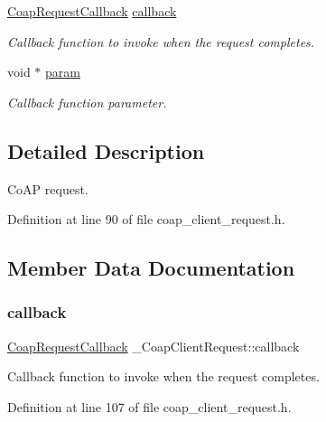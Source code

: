 \begin{DoxyCompactItemize}
\hyperlink{coap__client__request_8h_ad85f4aee9cd7facc11c34385eda31f84}{Coap\+Request\+Callback} \hyperlink{struct__CoapClientRequest_ae458e60539a2180065c26d7e624d6932}{callback}
\begin{DoxyCompactList}\small\item\em Callback function to invoke when the request completes. \end{DoxyCompactList}\item 
void $\ast$ \hyperlink{struct__CoapClientRequest_a54b49337ac3c569814acccc3b183d872}{param}
\begin{DoxyCompactList}\small\item\em Callback function parameter. \end{DoxyCompactList}\end{DoxyCompactItemize}


\subsection{Detailed Description}
Co\+AP request. 

Definition at line 90 of file coap\+\_\+client\+\_\+request.\+h.



\subsection{Member Data Documentation}
\mbox{\label{struct__CoapClientRequest_ae458e60539a2180065c26d7e624d6932}} 
\subsubsection{\texorpdfstring{callback}{callback}}
{\footnotesize\ttfamily \hyperlink{coap__client__request_8h_ad85f4aee9cd7facc11c34385eda31f84}{Coap\+Request\+Callback} \+\_\+\+Coap\+Client\+Request\+::callback}



Callback function to invoke when the request completes. 



Definition at line 107 of file coap\+\_\+client\+\_\+request.\+h.

\mbox{\label{struct__CoapClientRequest_aadceccf87b412f53a9e4549c3a3fec5c}} 
